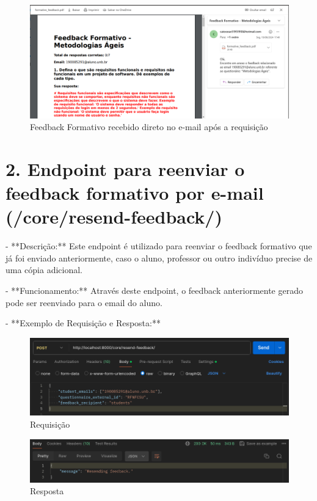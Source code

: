 \begin{figure}[H]
    \centering
    \includegraphics[width=1\textwidth]{figuras/feedback.png}
    \caption{Feedback Formativo recebido direto no e-mail após a requisição}
    \label{fig:report_questions}
\end{figure}

\section*{2. Endpoint para reenviar o feedback formativo por e-mail (/core/resend-feedback/)}

- **Descrição:** Este endpoint é utilizado para reenviar o feedback formativo que já foi enviado anteriormente, caso o aluno, professor ou outro indivíduo precise de uma cópia adicional.

- **Funcionamento:** Através deste endpoint, o feedback anteriormente gerado pode ser reenviado para o email do aluno.

- **Exemplo de Requisição e Resposta:**

\begin{figure}[H]
    \centering
    \includegraphics[width=1\textwidth]{figuras/resend_report.png}
    \caption{Requisição}
    \label{fig:report_questions}
\end{figure}

\begin{figure}[H]
    \centering
    \includegraphics[width=1\textwidth]{figuras/resend_report_result.png}
    \caption{Resposta}
    \label{fig:report_questions}
\end{figure}

